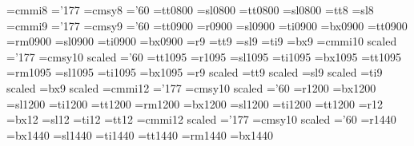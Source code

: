 \font\eighti=cmmi8 \skewchar\eighti='177
\font\eightsy=cmsy8 \skewchar\eightsy='60
\iflongDCfontnames
  \font\eighttt=\fontid tt0800
  \font\eightsl=\fontid sl0800
\else\iflongECfontnames
  \font\eighttt=\fontid tt0800
  \font\eightsl=\fontid sl0800
\else
  \font\eighttt=\fontid tt8
  \font\eightsl=\fontid sl8
\fi
\fi
%
%
\font\ninei=cmmi9 \skewchar\ninei='177
\font\ninesy=cmsy9 \skewchar\ninesy='60
\iflongDCfontnames
  \font\ninett=\fontid tt0900
  \font\ninerm=\fontid r0900
  \font\ninesl=\fontid sl0900
  \font\nineit=\fontid ti0900
  \font\ninebf=\fontid bx0900
\else\iflongECfontnames
  \font\ninett=\fontid tt0900
  \font\ninerm=\fontid rm0900
  \font\ninesl=\fontid sl0900
  \font\nineit=\fontid ti0900
  \font\ninebf=\fontid bx0900
\else
  \font\ninerm=\fontid r9
  \font\ninett=\fontid tt9
  \font\ninesl=\fontid sl9
  \font\nineit=\fontid ti9
  \font\ninebf=\fontid bx9
\fi
\fi
%
%
\font\elvi=cmmi10 scaled \magstephalf \skewchar\elvi='177
\font\elvsy=cmsy10 scaled \magstephalf \skewchar\elvsy='60
\iflongDCfontnames
  \font\elvtt=\fontid tt1095
  \font\elvrm=\fontid r1095
  \font\elvsl=\fontid sl1095
  \font\elvit=\fontid ti1095
  \font\elvbf=\fontid bx1095
\else\iflongECfontnames
  \font\elvtt=\fontid tt1095
  \font\elvrm=\fontid rm1095
  \font\elvsl=\fontid sl1095
  \font\elvit=\fontid ti1095
  \font\elvbf=\fontid bx1095
\else
  \font\elvrm=\fontid r9 scaled \magstephalf
  \font\elvtt=\fontid tt9 scaled \magstephalf
  \font\elvsl=\fontid sl9 scaled \magstephalf
  \font\elvit=\fontid ti9 scaled \magstephalf
  \font\elvbf=\fontid bx9 scaled \magstephalf
\fi
\fi
%
%
\font\twli=cmmi12 \skewchar\twli='177
\font\twlsy=cmsy10 scaled  \skewchar\twlsy='60
\iflongDCfontnames
  \font\twlrm=\fontid r1200
  \font\twlbf=\fontid bx1200
  \font\twlsl=\fontid sl1200
  \font\twlit=\fontid ti1200
  \font\twltt=\fontid tt1200
\else\iflongECfontnames
  \font\twlrm=\fontid rm1200
  \font\twlbf=\fontid bx1200
  \font\twlsl=\fontid sl1200
  \font\twlit=\fontid ti1200
  \font\twltt=\fontid tt1200
\else
  \font\twlrm=\fontid r12
  \font\twlbf=\fontid bx12
  \font\twlsl=\fontid sl12
  \font\twlit=\fontid ti12
  \font\twltt=\fontid tt12
\fi
\fi
%
%
\font\frti=cmmi12 scaled  \skewchar\frti='177
\font\frtsy=cmsy10 scaled  \skewchar\frtsy='60
\iflongDCfontnames
  \font\frtrm=\fontid r1440
  \font\frtbf=\fontid bx1440
  \font\frtsl=\fontid sl1440
  \font\frtit=\fontid ti1440
  \font\frttt=\fontid tt1440
\else\iflongECfontnames
  \font\frtrm=\fontid rm1440
  \font\frtbf=\fontid bx1440
